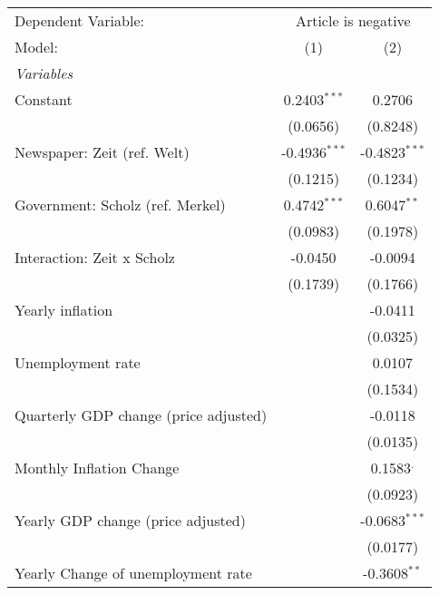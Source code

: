 
\begingroup
\centering
\begin{tabular}{lcc}
   \tabularnewline \midrule \midrule
   Dependent Variable: & \multicolumn{2}{c}{Article is negative}\\
   Model:                                & (1)             & (2)\\  
   \midrule
   \emph{Variables}\\
   Constant                              & 0.2403$^{***}$  & 0.2706\\   
                                         & (0.0656)        & (0.8248)\\   
   Newspaper: Zeit (ref. Welt)           & -0.4936$^{***}$ & -0.4823$^{***}$\\   
                                         & (0.1215)        & (0.1234)\\   
   Government: Scholz (ref. Merkel)      & 0.4742$^{***}$  & 0.6047$^{**}$\\   
                                         & (0.0983)        & (0.1978)\\   
   Interaction: Zeit x Scholz            & -0.0450         & -0.0094\\   
                                         & (0.1739)        & (0.1766)\\   
   Yearly inflation                      &                 & -0.0411\\   
                                         &                 & (0.0325)\\   
   Unemployment rate                     &                 & 0.0107\\   
                                         &                 & (0.1534)\\   
   Quarterly GDP change (price adjusted) &                 & -0.0118\\   
                                         &                 & (0.0135)\\   
   Monthly Inflation Change              &                 & 0.1583$^{.}$\\   
                                         &                 & (0.0923)\\   
   Yearly GDP change (price adjusted)    &                 & -0.0683$^{***}$\\   
                                         &                 & (0.0177)\\   
   Yearly Change of unemployment rate    &                 & -0.3608$^{**}$\\   

\end{tabular}
